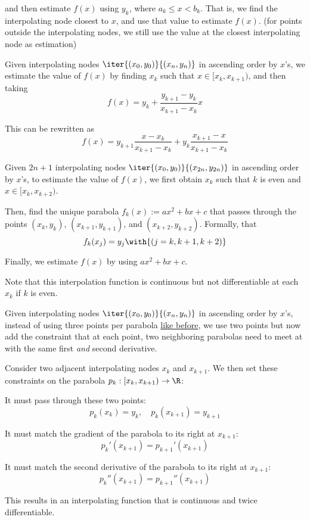 and then estimate $f(x)$ using $y_k$, where $a_k\leq x<b_k$. That is, we find
the interpolating node closest to $x$, and use that value to estimate $f(x)$.
(for points outside the interpolating nodes, we still use the value at the
closest interpolating node as estimation)

\label{b2a543c}

Given interpolating nodes $\iter{(x_0,y_0)}{(x_n,y_n)}$ in ascending order by
$x$'s, we estimate the value of $f(x)$ by finding $x_k$ such that
$x\in[x_k,x_{k+1})$, and then taking
$$
  f(x)=y_k+\frac{y_{k+1}-y_k}{x_{k+1}-x_k}x
$$

This can be rewritten as
$$
  f(x)=y_{k+1}\frac{x-x_k}{x_{k+1}-x_k}+y_k\frac{x_{k+1}-x}{x_{k+1}-x_k}
$$

\label{aeef34f}

Given $2n+1$ interpolating nodes $\iter{(x_0,y_0)}{(x_{2n},y_{2n})}$ in
ascending order by $x$'s, to estimate the value of $f(x)$, we first obtain
$x_k$ such that $k$ is even and $x\in[x_k,x_{k+2})$.

Then, find the unique parabola $f_k(x):=ax^2+bx+c$ that passes through the
points $(x_{k},y_{k})$, $(x_{k+1},y_{k+1})$, and $(x_{k+2},y_{k+2})$. Formally,
that
$$
  f_k(x_j)=y_j\with{(j=k,k+1,k+2)}
$$

Finally, we estimate $f(x)$ by using $ax^2+bx+c$.

Note that this interpolation function is continuous but not differentiable at
each $x_k$ if $k$ is even.

\label{b29ed82}

Given interpolating nodes $\iter{(x_0,y_0)}{(x_n,y_n)}$ in ascending order by
$x$'s, instead of using three points per parabola \href{aeef34f}{like before},
we use two points but now add the constraint that at each point, two
neighboring parabolas need to meet at with the same first \textit{and} second
derivative.

Consider two adjacent interpolating nodes $x_k$ and $x_{k+1}$. We then set
these constraints on the parabola $p_k:[x_k,x_{k+1})\to\R$:
\begin{enumerati}
  \item It must pass through these two points:
  $$
    p_k(x_k)=y_k,\quad p_k(x_{k+1})=y_{k+1}
  $$
  \item It must match the gradient of the parabola to its right at $x_{k+1}$:
  $$
    p_k'(x_{k+1})=p_{k+1}'(x_{k+1})
  $$
  \item It must match the second derivative of the parabola to its right at
        $x_{k+1}$:
  $$
    p_k''(x_{k+1})=p_{k+1}''(x_{k+1})
  $$
\end{enumerati}

This results in an interpolating function that is continuous and twice
differentiable.
